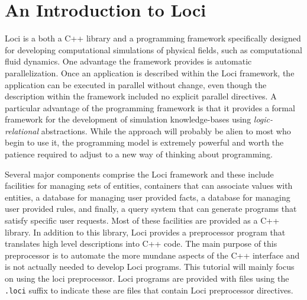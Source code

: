 \chapter{An Introduction to Loci}

Loci is a both a C++ library and a programming framework specifically
designed for developing computational simulations of physical fields,
such as computational fluid dynamics.  One advantage the framework
provides is automatic parallelization.  Once an application is
described within the Loci framework, the application can be executed
in parallel without change, even though the description within the
framework included no explicit parallel directives.  A particular
advantage of the programming framework is that it provides a formal
framework for the development of simulation knowledge-bases using {\em
  logic-relational} abstractions.  While the approach will probably be
alien to most who begin to use it, the programming model is extremely
powerful and worth the patience required to adjust to a new way of
thinking about programming.

Several major components comprise the Loci framework and these include
facilities for managing sets of entities, containers that can
associate values with entities, a database for managing user provided
facts, a database for managing user provided rules, and finally, a
query system that can generate programs that satisfy specific user
requests.  Most of these facilities are provided as a C++ library.  In
addition to this library, Loci provides a preprocessor program that
translates high level descriptions into C++ code.  The main purpose of
this preprocessor is to automate the more mundane aspects of the C++
interface and is not actually needed to develop Loci programs.  This
tutorial will mainly focus on using the loci preprocessor.  Loci
programs are provided with files using the {\tt .loci} suffix to
indicate these are files that contain Loci preprocessor directives.




